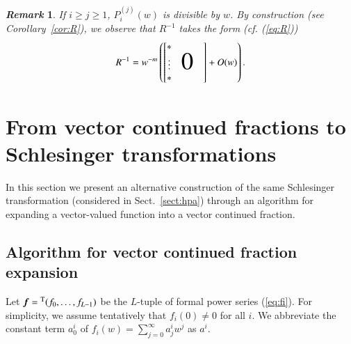 \documentclass[12pt]{article}
\newtheorem{remark}[thm]{\it Remark}
\numberwithin{equation}{section}
\begin{document}
\begin{remark}\rm
If $i \geq j \geq 1$, 
$P^{(j)}_i(w)$ is divisible by $w$.
By construction (see Corollary~\ref{cor:R}), we observe that
$R^{-1}$ takes the form
(cf. (\ref{eq:R}))
\[
R^{-1}
= 
w^{-m}
\left(
\begin{bmatrix}
* &     & \\ 
\vdots  &$\mbox{\Huge 0}$ &  \\ 
*&&
\end{bmatrix} 
+O(w)
\right).
\]
\end{remark}








\section{From vector continued fractions to Schlesinger transformations}
\label{sect:cf}


In this section 
we present an alternative construction
 of the same Schlesinger transformation (considered in Sect.~\ref{sect:hpa})
through an algorithm for expanding a vector-valued function
into a 
vector continued fraction.




\subsection{Algorithm for vector continued fraction expansion}


Let 
${\boldsymbol f}={}^{\rm T}(f_0,\ldots,f_{L-1})$ 
be the $L$-tuple of formal power series (\ref{eq:fi}).
For simplicity, 
we assume tentatively  that $f_i(0) \neq 0$ for all $ i$.
We abbreviate the constant term $a^i_0$
of $f_i(w)=\sum_{j=0}^\infty a^i_j w^j$ as $a^i$.
\end{document}
